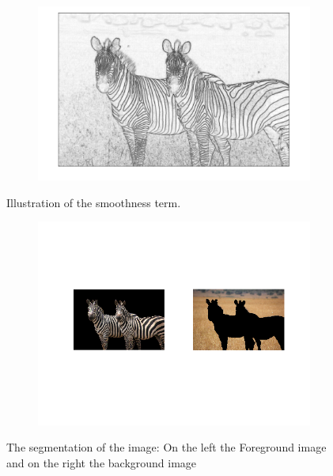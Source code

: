 \documentclass{paper}
\begin{document}
\begin{figure}[H]
    \centering
    \begin{subfigure}{1.0\textwidth}
        \includegraphics[width=\textwidth]{../../outputs/p4/image_segmentation/zebra2/smoothness}
    \end{subfigure}
    \caption{Illustration of the smoothness term.}
    \label{fig:segmentation_zebra2_smoothness}       
\end{figure}

\begin{figure}[H]
    \centering
    \begin{subfigure}{1.0\textwidth}
        \includegraphics[width=\textwidth]{../../outputs/p4/image_segmentation/zebra2/segmentation}
    \end{subfigure}
    \caption{The segmentation of the image: On the left the Foreground image and on the right the background image}
    \label{fig:segmentation_zebra2_segmenation}       
\end{figure}
\end{document}
